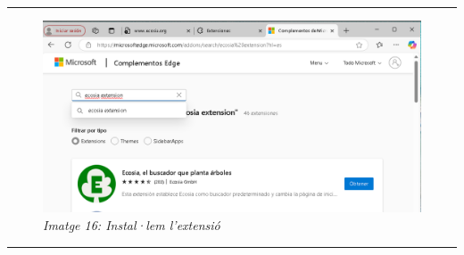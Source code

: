 \documentclass[
  a4paper,
]{article}
\begin{document}
\begin{center}\rule{0.5\linewidth}{0.5pt}\end{center}

\begin{figure}
\centering
\includegraphics{png/1-EdgeExtensions.png}
\caption{\emph{Imatge 16: Instal·lem l'extensió}}
\end{figure}

\begin{center}\rule{0.5\linewidth}{0.5pt}\end{center}
\end{document}
